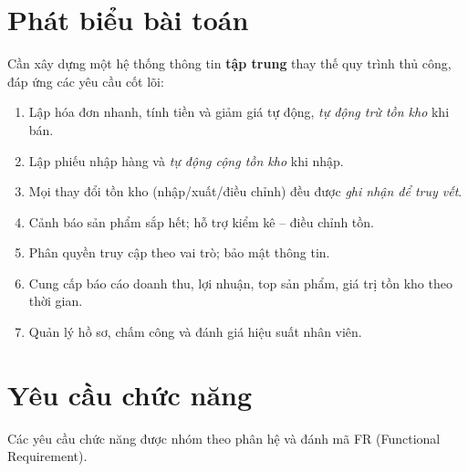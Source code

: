 \documentclass[12pt,a4paper]{report}
\begin{document}
\section{Phát biểu bài toán}
Cần xây dựng một hệ thống thông tin \textbf{tập trung} thay thế quy trình thủ công, đáp ứng các yêu cầu cốt lõi:
\begin{enumerate}[leftmargin=1.4cm,nosep]
  \item Lập hóa đơn nhanh, tính tiền và giảm giá tự động, \emph{tự động trừ tồn kho} khi bán.
  \item Lập phiếu nhập hàng và \emph{tự động cộng tồn kho} khi nhập.
  \item Mọi thay đổi tồn kho (nhập/xuất/điều chỉnh) đều được \emph{ghi nhận để truy vết}.
  \item Cảnh báo sản phẩm sắp hết; hỗ trợ kiểm kê -- điều chỉnh tồn.
  \item Phân quyền truy cập theo vai trò; bảo mật thông tin.
  \item Cung cấp báo cáo doanh thu, lợi nhuận, top sản phẩm, giá trị tồn kho theo thời gian.
  \item Quản lý hồ sơ, chấm công và đánh giá hiệu suất nhân viên.
\end{enumerate}

\section{Yêu cầu chức năng}
Các yêu cầu chức năng được nhóm theo phân hệ và đánh mã FR (Functional Requirement).
\end{document}

